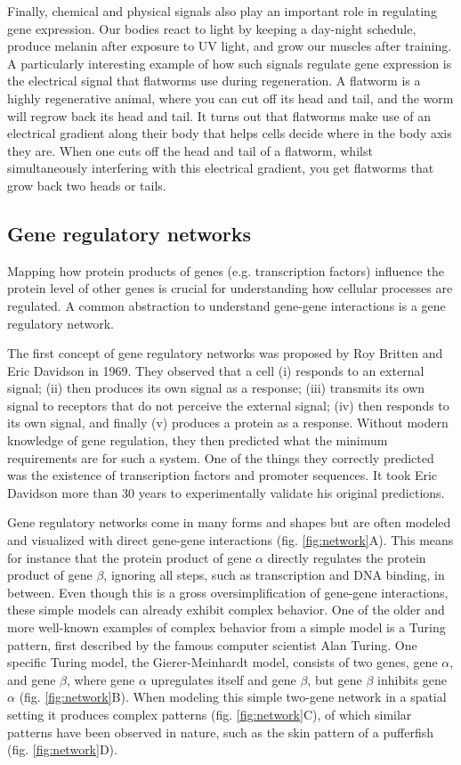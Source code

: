 Finally, chemical and physical signals also play an important role in regulating gene expression. Our bodies react to light by keeping a day-night schedule, produce melanin after exposure to UV light, and grow our muscles after training. A particularly interesting example of how such signals regulate gene expression is the electrical signal that flatworms use during regeneration. A flatworm is a highly regenerative animal, where you can cut off its head and tail, and the worm will regrow back its head and tail. It turns out that flatworms make use of an electrical gradient along their body that helps cells decide where in the body axis they are. When one cuts off the head and tail of a flatworm, whilst simultaneously interfering with this electrical gradient, you get flatworms that grow back two heads or tails\cite{Levin2014}.

\subsection{Gene regulatory networks}

Mapping how protein products of genes (e.g. transcription factors) influence the protein level of other genes is crucial for understanding how cellular processes are regulated. A common abstraction to understand gene-gene interactions is a gene regulatory network.

The first concept of gene regulatory networks was proposed by Roy Britten and Eric Davidson in 1969\cite{Britten_1969}. They observed that a cell (i) responds to an external signal; (ii) then produces its own signal as a response; (iii) transmits its own signal to receptors that do not perceive the external signal; (iv) then responds to its own signal, and finally (v) produces a protein as a response. Without modern knowledge of gene regulation, they then predicted what the minimum requirements are for such a system. One of the things they correctly predicted was the existence of transcription factors and promoter sequences. It took Eric Davidson more than 30 years to experimentally validate his original predictions\cite{Davidson_2002}.

Gene regulatory networks come in many forms and shapes but are often modeled and visualized with direct gene-gene interactions (fig. \ref{fig:network}A). This means for instance that the protein product of gene $\alpha$ directly regulates the protein product of gene $\beta$, ignoring all steps, such as transcription and DNA binding, in between. Even though this is a gross oversimplification of gene-gene interactions, these simple models can already exhibit complex behavior. One of the older and more well-known examples of complex behavior from a simple model is a Turing pattern, first described by the famous computer scientist Alan Turing\cite{Turing1952}. One specific Turing model, the Gierer-Meinhardt model, consists of two genes, gene $\alpha$, and gene $\beta$, where gene $\alpha$ upregulates itself and gene $\beta$, but gene $\beta$ inhibits gene $\alpha$ (fig. \ref{fig:network}B). When modeling this simple two-gene network in a spatial setting it produces complex patterns (fig. \ref{fig:network}C), of which similar patterns have been observed in nature, such as the skin pattern of a pufferfish (fig. \ref{fig:network}D).

